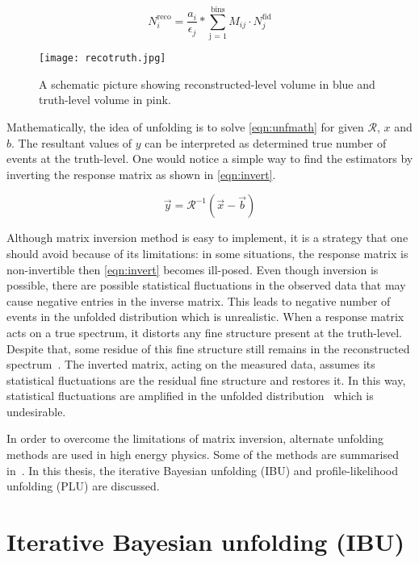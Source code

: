 \begin{equation}
    N_{i}^{\text{reco}} = \frac{a_i}{\epsilon_j} * \sum_{\text{j = 1}}^{\text{bins}} M_{ij} \cdot N_{j}^{\text{fid}} 
\end{equation}


\begin{figure}
    \centering
        \texttt{[image: recotruth.jpg]}
        \caption{A schematic picture showing reconstructed-level volume in blue and 
        truth-level volume in pink.}
           \label{fig:recotruth}
  \end{figure}

Mathematically, the idea of unfolding is to solve \cref{eqn:unfmath} for given 
$\mathcal{R}$, $x$ and $b$. The resultant values of $y$ can be interpreted as 
determined true number of events at the truth-level. One would notice a simple way to 
find the estimators by inverting the response matrix as shown in \cref{eqn:invert}.

\begin{equation}
    \vec{y} = \mathcal{R}^{-1} (\vec{x}-\vec{b})
    \label{eqn:invert}
\end{equation}

Although matrix inversion method is easy to implement, it is a strategy that one should 
avoid because of its limitations: in some situations, the response matrix is non-invertible
then \cref{eqn:invert} becomes ill-posed. Even though inversion is possible, there are possible
statistical fluctuations in the observed data that may cause negative entries in the 
inverse matrix. This leads to negative number of events in the unfolded distribution
which is unrealistic. When a response matrix acts on a true spectrum, it distorts any 
fine structure present at the truth-level. Despite that, some residue of this fine 
structure still remains in the reconstructed spectrum~\cite{cowan}. The inverted matrix, 
acting on the measured data, assumes its statistical fluctuations are the residual fine 
structure and restores it. In this way, statistical fluctuations are amplified in the unfolded
distribution~\cite{inverse} which is undesirable.

In order to overcome the limitations of matrix inversion, alternate unfolding methods are used
in high energy physics. Some of the methods are summarised in~\cite{refId0}.
In this thesis, the iterative Bayesian unfolding (IBU) and profile-likelihood unfolding (PLU)
are discussed.



\section{Iterative Bayesian unfolding (IBU)}

